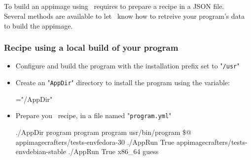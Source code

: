 \newpage
\subsection{\abuild}

To build an appimage using \abuild\ requires to prepare a recipe in a JSON file. \\
Several methods are available to let \abuild\ know how to retreive your program's data to build the appimage. 

\subsubsection*{Recipe using a local build of your program}

\begin{itemize}
\item Configure and build the program with the installation prefix set to "\texttt{/usr}"
{\footnotesize{
\begin{scripti}
  
 
\end{scripti}
}}
\item Create an "\texttt{AppDir}" directory to install the program using the  variable: 
{\footnotesize{
\begin{scripti}
  
   ="/AppDir"
\end{scripti}
}}
\item Prepare you \abuild\ recipe, in a file named "\texttt{program.yml}" 
{\footnotesize{
\begin{scripti}
 
   ./AppDir
     program     
     program   
     program   
     
     usr/bin/program
     \$@
       appimagecrafters/tests-envfedora-30
       ./AppRun
       True
       appimagecrafters/tests-envdebian-stable
       ./AppRun
       True
   x86\_64
   guess
\end{scripti}
}}
\end{itemize}

